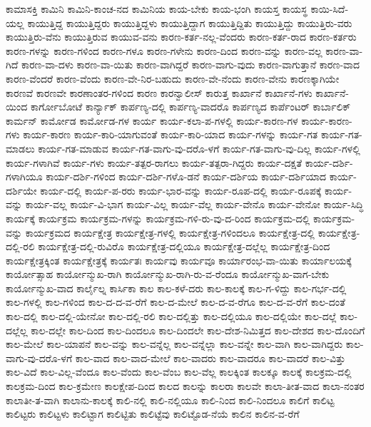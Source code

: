 {ಕಾಮಾಸಕ್ತಿ
ಕಾಮಿನಿ
ಕಾಮಿನಿ-ಕಾಂಚ-ನದ
ಕಾಮಿನಿಯ
ಕಾಯ-ಬೇಕು
ಕಾಯ-ಭಂಗಿ
ಕಾಯಸ್ತ
ಕಾಯಸ್ಥ
ಕಾಯಿ-ಸಿದೆ-ಯಲ್ಲ
ಕಾಯುತ್ತಿದ್ದ
ಕಾಯುತ್ತಿದ್ದರು
ಕಾಯುತ್ತಿದ್ದಳು
ಕಾಯುತ್ತಿದ್ದಾಗ
ಕಾಯುತ್ತಿದ್ದಿತು
ಕಾಯುತ್ತಿದ್ದು
ಕಾಯುತ್ತಿರು-ವರು
ಕಾಯುತ್ತಿರು-ವೆನು
ಕಾಯುತ್ತಿರುವ
ಕಾಯುವ-ವನು
ಕಾರಣ-ಕರ್ತ-ನಲ್ಲ-ವೆಂದರು
ಕಾರಣ-ಕರ್ತ-ರಾದ
ಕಾರಣ-ಕರ್ತರು
ಕಾರಣ-ಗಳನ್ನು
ಕಾರಣ-ಗಳಿಂದ
ಕಾರಣ-ಗಳೂ
ಕಾರಣ-ಗಳೇನು
ಕಾರಣ-ದಿಂದ
ಕಾರಣ-ವನ್ನು
ಕಾರಣ-ವಲ್ಲ
ಕಾರಣ-ವಾ-ಗಿದೆ
ಕಾರಣ-ವಾ-ದಳು
ಕಾರಣ-ವಾ-ಯಿತು
ಕಾರಣ-ವಾಗಿದ್ದರೆ
ಕಾರಣ-ವಾಗು-ವುದು
ಕಾರಣ-ವಾಗುತ್ತಾನೆ
ಕಾರಣ-ವಾದ
ಕಾರಣ-ವೆಂದರೆ
ಕಾರಣ-ವೆಂದು
ಕಾರಣ-ವೇ-ನಿರ-ಬಹುದು
ಕಾರಣ-ವೇ-ನೆಂದು
ಕಾರಣ-ವೇನು
ಕಾರಣಕ್ಕಾಗಿಯೇ
ಕಾರಣವೆ
ಕಾರಣವೇ
ಕಾರಣಾಂತರ-ಗಳಿಂದ
ಕಾರಣ
ಕಾರನ್ವಾಲೀಸ್
ಕಾರುತ್ತ
ಕಾರ್ಖಾನೆ
ಕಾರ್ಖಾನೆ-ಗಳು
ಕಾರ್ಖಾನೆ-ಯಿಂದ
ಕಾರ್ಗೋಬೋಟೆ
ಕಾರ್ನ್ಯಾಕ್
ಕಾರ್ಪಣ್ಯ-ದಲ್ಲಿ
ಕಾರ್ಪಣ್ಯ-ವಾದರೊ
ಕಾರ್ಪಣ್ಯದ
ಕಾರ್ಪೆಂಟರ್
ಕಾರ್ಬಾಲಿಕ್
ಕಾರ್ಮನ್
ಕಾರ್ಮೋಡ
ಕಾರ್ಮೋಡ-ಗಳ
ಕಾರ್ಯ
ಕಾರ್ಯ-ಕಲಾ-ಪ-ಗಳಲ್ಲಿ
ಕಾರ್ಯ-ಕಾರಣ-ಗಳ
ಕಾರ್ಯ-ಕಾರಣ-ಗಳು
ಕಾರ್ಯ-ಕಾರಣ
ಕಾರ್ಯ-ಕಾರಿ-ಯಾಗುವಂತೆ
ಕಾರ್ಯ-ಕಾರಿ-ಯಾದ
ಕಾರ್ಯ-ಗಳನ್ನು
ಕಾರ್ಯ-ಗತ
ಕಾರ್ಯ-ಗತ-ಮಾಡಲು
ಕಾರ್ಯ-ಗತ-ಮಾಡುವ
ಕಾರ್ಯ-ಗತ-ವಾಗು-ವು-ದರೊ-ಳಗೆ
ಕಾರ್ಯ-ಗತ-ವಾಗು-ವು-ದಿಲ್ಲ
ಕಾರ್ಯ-ಗಳಲ್ಲಿ
ಕಾರ್ಯ-ಗಳಾಗಿವೆ
ಕಾರ್ಯ-ಗಳು
ಕಾರ್ಯ-ತತ್ಪರ-ರಾಗಲು
ಕಾರ್ಯ-ತತ್ಪರಾ-ಗಿದ್ದರು
ಕಾರ್ಯ-ದಕ್ಷತೆ
ಕಾರ್ಯ-ದರ್ಶಿ-ಗಳಾಗಿಯೂ
ಕಾರ್ಯ-ದರ್ಶಿ-ಗಳಿಂದ
ಕಾರ್ಯ-ದರ್ಶಿ-ಗಳೊ-ಡನೆ
ಕಾರ್ಯ-ದರ್ಶಿಯ
ಕಾರ್ಯ-ದರ್ಶಿಯಾದ
ಕಾರ್ಯ-ದರ್ಶಿಯೇ
ಕಾರ್ಯ-ದಲ್ಲಿ
ಕಾರ್ಯ-ಪ-ರರು
ಕಾರ್ಯ-ಭಾರ-ವನ್ನು
ಕಾರ್ಯ-ರೂಪ-ದಲ್ಲಿ
ಕಾರ್ಯ-ರೂಪಕ್ಕೆ
ಕಾರ್ಯ-ವನ್ನು
ಕಾರ್ಯ-ವಲ್ಲ
ಕಾರ್ಯ-ವಿ-ಭಾಗ
ಕಾರ್ಯ-ವಿಲ್ಲ
ಕಾರ್ಯ-ವೆಲ್ಲ
ಕಾರ್ಯ-ವೇನೊ
ಕಾರ್ಯ-ವೇನೋ
ಕಾರ್ಯ-ಸಿದ್ಧಿ
ಕಾರ್ಯಕ್ಕೆ
ಕಾರ್ಯಕ್ರಮ
ಕಾರ್ಯಕ್ರಮ-ಗಳನ್ನು
ಕಾರ್ಯಕ್ರಮ-ಗಳಿ-ರು-ವು-ದ-ರಿಂದ
ಕಾರ್ಯಕ್ರಮ-ದಲ್ಲಿ
ಕಾರ್ಯಕ್ರಮ-ವನ್ನು
ಕಾರ್ಯಕ್ರಮದ
ಕಾರ್ಯಕ್ಷೇತ್ರ
ಕಾರ್ಯಕ್ಷೇತ್ರ-ಗಳಲ್ಲಿ
ಕಾರ್ಯಕ್ಷೇತ್ರ-ಗಳಿಂದಲೂ
ಕಾರ್ಯಕ್ಷೇತ್ರ-ದಲ್ಲಿ
ಕಾರ್ಯಕ್ಷೇತ್ರ-ದಲ್ಲಿ-ರಲಿ
ಕಾರ್ಯಕ್ಷೇತ್ರ-ದಲ್ಲಿ-ರುವಿರೊ
ಕಾರ್ಯಕ್ಷೇತ್ರ-ದಲ್ಲಿಯೂ
ಕಾರ್ಯಕ್ಷೇತ್ರ-ದಲ್ಲೆಲ್ಲ
ಕಾರ್ಯಕ್ಷೇತ್ರ-ದಿಂದ
ಕಾರ್ಯಕ್ಷೇತ್ರಕ್ಕಿಂತ
ಕಾರ್ಯಕ್ಷೇತ್ರಕ್ಕೆ
ಕಾರ್ಯತಃ
ಕಾರ್ಯವು
ಕಾರ್ಯವೂ
ಕಾರ್ಯಾರಂಭ-ವಾ-ಯಿತು
ಕಾರ್ಯಾಲಯಕ್ಕೆ
ಕಾರ್ಯೋತ್ಸಾಹ
ಕಾರ್ಯೋನ್ಮುಖ-ರಾಗಿ
ಕಾರ್ಯೋನ್ಮುಖ-ರಾಗಿ-ರು-ವ-ರೆಂದೂ
ಕಾರ್ಯೋನ್ಮುಖ-ವಾಗ-ಬೇಕು
ಕಾರ್ಯೋನ್ಮುಖ-ವಾದ
ಕಾರ್ಲೈಲ್ನ
ಕಾರ್ಸಿಕಾ
ಕಾಲ
ಕಾಲ-ಕಳೆ-ದರು
ಕಾಲ-ಕಾಲಕ್ಕೆ
ಕಾಲ-ಗ-ಳಿದ್ದು
ಕಾಲ-ಗರ್ಭ-ದಲ್ಲಿ
ಕಾಲ-ಗಳಲ್ಲಿ
ಕಾಲ-ಗಳಿಂದ
ಕಾಲ-ದ-ದ-ವ-ರೆಗೆ
ಕಾಲ-ದ-ಮೇಲೆ
ಕಾಲ-ದ-ವ-ರೆಗೂ
ಕಾಲ-ದ-ವ-ರೆಗೆ
ಕಾಲ-ದಂತೆ
ಕಾಲ-ದಲ್ಲಿ
ಕಾಲ-ದಲ್ಲಿ-ಯೇನೋ
ಕಾಲ-ದಲ್ಲಿ-ರಲಿ
ಕಾಲ-ದಲ್ಲಿತ್ತು
ಕಾಲ-ದಲ್ಲಿಯೂ
ಕಾಲ-ದಲ್ಲಿಯೇ
ಕಾಲ-ದಲ್ಲೆ
ಕಾಲ-ದಲ್ಲೆಲ್ಲ
ಕಾಲ-ದಲ್ಲೇ
ಕಾಲ-ದಿಂದ
ಕಾಲ-ದಿಂದಲೂ
ಕಾಲ-ದಿಂದಲೇ
ಕಾಲ-ದೇಶ-ನಿಮಿತ್ತದ
ಕಾಲ-ದೇಶದ
ಕಾಲ-ದೊಂದಿಗೆ
ಕಾಲ-ಮೇಲೆ
ಕಾಲ-ಯಾಪನೆ
ಕಾಲ-ವನ್ನು
ಕಾಲ-ವನ್ನೆಲ್ಲ
ಕಾಲ-ವನ್ನೆಲ್ಲಾ
ಕಾಲ-ವನ್ನೇ
ಕಾಲ-ವಾಗಿ
ಕಾಲ-ವಾಗಿದ್ದರು
ಕಾಲ-ವಾಗು-ವು-ದರೊ-ಳಗೆ
ಕಾಲ-ವಾದ
ಕಾಲ-ವಾದ-ಮೇಲೆ
ಕಾಲ-ವಾದರು
ಕಾಲ-ವಾದರೂ
ಕಾಲ-ವಾದರೆ
ಕಾಲ-ವಿತ್ತು
ಕಾಲ-ವಿದೆ
ಕಾಲ-ವಿಲ್ಲ-ವೆಂದೂ
ಕಾಲ-ವೆಂದು
ಕಾಲ-ವೆಂಬ
ಕಾಲ-ವೆಲ್ಲ
ಕಾಲಕ್ಕಿಂತ
ಕಾಲಕ್ಕೂ
ಕಾಲಕ್ಕೆ
ಕಾಲಕ್ರಮ-ದಲ್ಲಿ
ಕಾಲಕ್ರಮ-ದಿಂದ
ಕಾಲ-ಕ್ರಮೇಣ
ಕಾಲಕ್ಷೇಪ-ದಿಂದ
ಕಾಲದ
ಕಾಲನ್ನು
ಕಾಲರಾ
ಕಾಲವೇ
ಕಾಲಾ-ತೀತ-ವಾದ
ಕಾಲಾ-ನಂತರ
ಕಾಲಾತೀ-ತ-ವಾಗಿ
ಕಾಲಾನು-ಕಾಲಕ್ಕೆ
ಕಾಲಿ-ನಲ್ಲಿ
ಕಾಲಿ-ನಲ್ಲಿಯೂ
ಕಾಲಿ-ನಿಂದ
ಕಾಲಿ-ನಿಂದಲೂ
ಕಾಲಿಗೆ
ಕಾಲಿಟ್ಟ
ಕಾಲಿಟ್ಟರು
ಕಾಲಿಟ್ಟಳು
ಕಾಲಿಟ್ಟಾಗ
ಕಾಲಿಟ್ಟಿತು
ಕಾಲಿಟ್ಟೆವು
ಕಾಲಿಟ್ಟೊಡ-ನೆಯೆ
ಕಾಲಿನ
ಕಾಲಿನ-ವ-ರೆಗೆ
}
